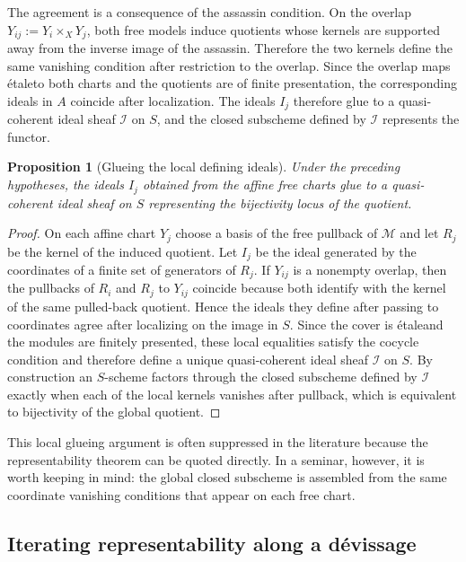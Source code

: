 \documentclass[11pt,oneside]{article}
\newtheorem{proposition}[theorem]{Proposition}
\newcommand{\I}{\mathcal I}
\newcommand{\M}{\mathcal M}
\newcommand{\etale}{\'etale}
\begin{document}
The agreement is a consequence of the assassin condition.  On the overlap $Y_{ij}:=Y_i\times_X Y_j$, both free models induce quotients whose kernels are supported away from the inverse image of the assassin.  Therefore the two kernels define the same vanishing condition after restriction to the overlap.  Since the overlap maps \etale to both charts and the quotients are of finite presentation, the corresponding ideals in $A$ coincide after localization.  The ideals $I_j$ therefore glue to a quasi-coherent ideal sheaf $\I$ on $S$, and the closed subscheme defined by $\I$ represents the functor.

\begin{proposition}[Glueing the local defining ideals]\label{prop:glueing-ideals-long}
Under the preceding hypotheses, the ideals $I_j$ obtained from the affine free charts glue to a quasi-coherent ideal sheaf on $S$ representing the bijectivity locus of the quotient.
\end{proposition}

\begin{proof}
On each affine chart $Y_j$ choose a basis of the free pullback of $\M$ and let $R_j$ be the kernel of the induced quotient.  Let $I_j$ be the ideal generated by the coordinates of a finite set of generators of $R_j$.  If $Y_{ij}$ is a nonempty overlap, then the pullbacks of $R_i$ and $R_j$ to $Y_{ij}$ coincide because both identify with the kernel of the same pulled-back quotient.  Hence the ideals they define after passing to coordinates agree after localizing on the image in $S$.  Since the cover is \etale and the modules are finitely presented, these local equalities satisfy the cocycle condition and therefore define a unique quasi-coherent ideal sheaf $\I$ on $S$.  By construction an $S$-scheme factors through the closed subscheme defined by $\I$ exactly when each of the local kernels vanishes after pullback, which is equivalent to bijectivity of the global quotient.
\end{proof}

This local glueing argument is often suppressed in the literature because the representability theorem can be quoted directly.  In a seminar, however, it is worth keeping in mind: the global closed subscheme is assembled from the same coordinate vanishing conditions that appear on each free chart.

\subsection{Iterating representability along a d\'evissage}
\end{document}
